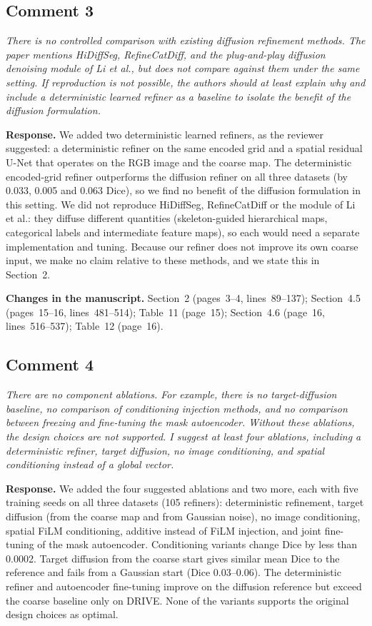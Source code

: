 \documentclass[11pt,a4paper]{article}
\newenvironment{revcomment}{\par\medskip\noindent\begin{minipage}{\linewidth}\itshape}{\end{minipage}\par\smallskip}
\begin{document}
\subsection*{Comment 3}
\begin{revcomment}There is no controlled comparison with existing diffusion refinement methods. The paper mentions HiDiffSeg, RefineCatDiff, and the plug-and-play diffusion denoising module of Li et al., but does not compare against them under the same setting. If reproduction is not possible, the authors should at least explain why and include a deterministic learned refiner as a baseline to isolate the benefit of the diffusion formulation.\end{revcomment}
\textbf{Response.} We added two deterministic learned refiners, as the reviewer suggested: a deterministic refiner on the same encoded grid and a spatial residual U-Net that operates on the RGB image and the coarse map. The deterministic encoded-grid refiner outperforms the diffusion refiner on all three datasets (by 0.033, 0.005 and 0.063 Dice), so we find no benefit of the diffusion formulation in this setting. We did not reproduce HiDiffSeg, RefineCatDiff or the module of Li et al.: they diffuse different quantities (skeleton-guided hierarchical maps, categorical labels and intermediate feature maps), so each would need a separate implementation and tuning. Because our refiner does not improve its own coarse input, we make no claim relative to these methods, and we state this in Section~2.

\textbf{Changes in the manuscript.} Section~2 (pages~3--4, lines~89--137); Section~4.5 (pages~15--16, lines~481--514); Table~11 (page~15); Section~4.6 (page~16, lines~516--537); Table~12 (page~16).

\subsection*{Comment 4}
\begin{revcomment}There are no component ablations. For example, there is no target-diffusion baseline, no comparison of conditioning injection methods, and no comparison between freezing and fine-tuning the mask autoencoder. Without these ablations, the design choices are not supported. I suggest at least four ablations, including a deterministic refiner, target diffusion, no image conditioning, and spatial conditioning instead of a global vector.\end{revcomment}
\textbf{Response.} We added the four suggested ablations and two more, each with five training seeds on all three datasets (105 refiners): deterministic refinement, target diffusion (from the coarse map and from Gaussian noise), no image conditioning, spatial FiLM conditioning, additive instead of FiLM injection, and joint fine-tuning of the mask autoencoder. Conditioning variants change Dice by less than 0.0002. Target diffusion from the coarse start gives similar mean Dice to the reference and fails from a Gaussian start (Dice 0.03--0.06). The deterministic refiner and autoencoder fine-tuning improve on the diffusion reference but exceed the coarse baseline only on DRIVE. None of the variants supports the original design choices as optimal.
\end{document}
